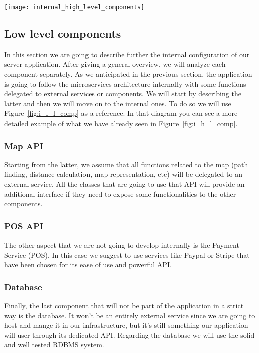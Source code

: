 \begin{sidewaysfigure}
\centering
\texttt{[image: internal\_high\_level\_components]}
\caption{Component view: Internal High Level Architecture}
\label{fig:i_h_l_comp}
\end{sidewaysfigure}

\pagebreak
\subsection{Low level components}
In this section we are going to describe further the internal configuration of our server
application. After giving a general overview, we will analyze each component separately.
As we anticipated in the previous section, the application is going to follow the microservices
architecture internally with some functions delegated to external services or components.
We will start by describing the latter and then we will move on to the internal ones.
To do so we will use Figure~\ref{fig:i_l_l_comp} as a reference.
In that diagram you can see a more detailed example of what we have already seen
in Figure~\ref{fig:i_h_l_comp}.

\subsubsection{Map API}
Starting from the latter, we assume that all functions related to the map (path finding,
distance calculation, map representation, etc) will be delegated to an external service.
All the classes that are going to use that API will provide an additional interface if they 
need to expose some functionalities to the other components.
\subsubsection{POS API}
The other aspect that we are not going to develop internally is the Payment Service (POS).
In this case we suggest to use services like Paypal or Stripe that have been chosen
for its ease of use and powerful API.
\subsubsection{Database}
Finally, the last component that will not be part of the application in a strict way is the database.
It won't be an entirely external service since we are going to host and mange it in our infrastructure,
but it's still something our application will user through its dedicated API. Regarding the
database we will use the solid and well tested RDBMS system.

